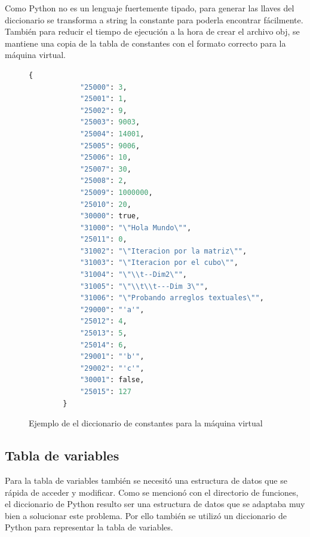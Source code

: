 Como Python no es un lenguaje fuertemente tipado, para generar las llaves del diccionario se transforma a string la constante para poderla encontrar fácilmente. También para reducir el tiempo de ejecución a la hora de crear el archivo obj, se mantiene una copia de la tabla de constantes con el formato correcto para la máquina virtual.
\begin{figure}[htbp]
    \centering
    \begin{lstlisting}[language=Python]
        {
            "25000": 3,
            "25001": 1,
            "25002": 9,
            "25003": 9003,
            "25004": 14001,
            "25005": 9006,
            "25006": 10,
            "25007": 30,
            "25008": 2,
            "25009": 1000000,
            "25010": 20,
            "30000": true,
            "31000": "\"Hola Mundo\"",
            "25011": 0,
            "31002": "\"Iteracion por la matriz\"",
            "31003": "\"Iteracion por el cubo\"",
            "31004": "\"\\t--Dim2\"",
            "31005": "\"\\t\\t---Dim 3\"",
            "31006": "\"Probando arreglos textuales\"",
            "29000": "'a'",
            "25012": 4,
            "25013": 5,
            "25014": 6,
            "29001": "'b'",
            "29002": "'c'",
            "30001": false,
            "25015": 127
        }
    \end{lstlisting}
    \caption{Ejemplo de el diccionario de constantes para la máquina virtual}
    \label{fig:my_label}
\end{figure}

\FloatBarrier

\subsection{Tabla de variables}

Para la tabla de variables también se necesitó una estructura de datos que se rápida de acceder y modificar. Como se mencionó con el directorio de funciones, el diccionario de Python resulto ser una estructura de datos que se adaptaba muy bien a solucionar este problema. Por ello también se utilizó un diccionario de Python para representar la tabla de variables.


